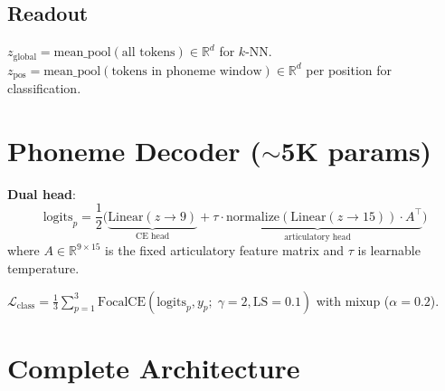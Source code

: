 \documentclass[11pt,letterpaper]{article}
\newcommand{\R}{\mathbb{R}}
\begin{document}
\subsection{Readout}

$z_{\text{global}} = \text{mean\_pool}(\text{all tokens}) \in \R^d$ for $k$-NN. $z_{\text{pos}} = \text{mean\_pool}(\text{tokens in phoneme window}) \in \R^d$ per position for classification.


\section{Phoneme Decoder (${\sim}$5K params)}

\textbf{Dual head}:
\begin{equation}
\text{logits}_p = \frac{1}{2}\bigl(\underbrace{\text{Linear}(z \to 9)}_{\text{CE head}} + \underbrace{\tau \cdot \text{normalize}(\text{Linear}(z \to 15)) \cdot A^\top}_{\text{articulatory head}}\bigr)
\end{equation}
where $A \in \R^{9 \times 15}$ is the fixed articulatory feature matrix and $\tau$ is learnable temperature.

$\mathcal{L}_{\text{class}} = \frac{1}{3}\sum_{p=1}^{3} \text{FocalCE}(\text{logits}_p, y_p;\; \gamma{=}2, \text{LS}{=}0.1)$
with mixup ($\alpha{=}0.2$).


\section{Complete Architecture}
\end{document}
